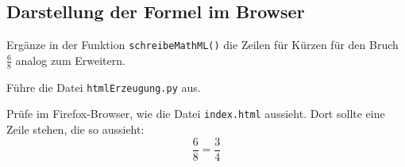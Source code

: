 \subsection*{Darstellung der Formel im Browser}

Ergänze in der Funktion \texttt{schreibeMathML()} die Zeilen für Kürzen für den Bruch $\frac{6}{8}$ analog zum Erweitern.

Führe die Datei \texttt{htmlErzeugung.py} aus.

Prüfe im Firefox-Browser, wie die Datei \texttt{index.html} aussieht. Dort sollte eine Zeile stehen, die so aussieht:
\[
\frac{6}{8} = \frac{3}{4}
\]
